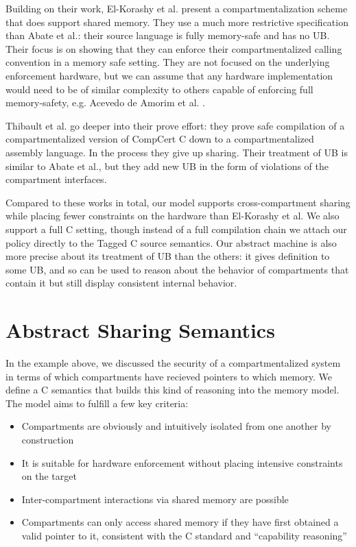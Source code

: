 Building on their work, El-Korashy et al. \cite{ElKorashy22:SecurePtrs} present a compartmentalization
scheme that does support shared memory. They use a much more restrictive specification
than Abate et al.: their source language is fully memory-safe and has no UB. Their
focus is on showing that they can enforce their compartmentalized calling convention
in a memory safe setting. They are not focused on the underlying enforcement hardware,
but we can assume that any hardware implementation would need to be of similar complexity
to others capable of enforcing full memory-safety, e.g. Acevedo de Amorim et al.
\cite{AdA18:MeaningMemorySafety}. 

Thibault et al. \cite{} go deeper into their prove effort: they prove safe compilation of a
compartmentalized version of CompCert C down to a compartmentalized assembly language.
In the process they give up sharing. Their treatment of UB is similar to Abate et al.,
but they add new UB in the form of violations of the compartment interfaces.

Compared to these works in total, our model supports cross-compartment sharing while placing
fewer constraints on the hardware than El-Korashy et al. We also support a full C setting,
though instead of a full compilation chain we attach our policy directly to the Tagged C
source semantics. Our abstract machine is also more precise about its treatment of UB than
the others: it gives definition to some UB, and so can be used to reason about the behavior
of compartments that contain it but still display consistent internal behavior.

\section{Abstract Sharing Semantics}

In the example above, we discussed the security of a compartmentalized
system in terms of which compartments have recieved pointers to which memory.
We define a C semantics that builds this kind of reasoning into the memory model.
The model aims to fulfill a few key criteria:

\begin{itemize}
\item Compartments are obviously and intuitively isolated from one another
  by construction
\item It is suitable for hardware enforcement without placing intensive constraints
  on the target
\item Inter-compartment interactions via shared memory are possible
\item Compartments can only access shared memory if they have first obtained a
  valid pointer to it, consistent with the C standard and ``capability reasoning''
\end{itemize}

